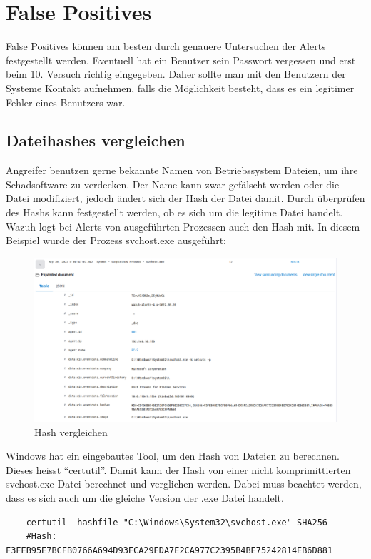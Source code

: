 \section{False Positives}
False Positives können am besten durch genauere Untersuchen der Alerts festgestellt werden.
Eventuell hat ein Benutzer sein Passwort vergessen und erst beim 10. Versuch richtig eingegeben.
Daher sollte man mit den Benutzern der Systeme Kontakt aufnehmen, falls die Möglichkeit besteht, dass es ein legitimer Fehler eines Benutzers war.  

\subsection{Dateihashes vergleichen}
Angreifer benutzen gerne bekannte Namen von Betriebssystem Dateien, um ihre Schadsoftware zu verdecken.
Der Name kann zwar gefälscht werden oder die Datei modifiziert, jedoch ändert sich der Hash der Datei damit.
Durch überprüfen des Hashs kann festgestellt werden, ob es sich um die legitime Datei handelt. \\

Wazuh logt bei Alerts von ausgeführten Prozessen auch den Hash mit.
In diesem Beispiel wurde der Prozess svchost.exe ausgeführt:
\begin{figure}[H]
    \centering
    \includegraphics[width=\linewidth]{../img/check-hash-1.png}
    \caption{Hash vergleichen}
\end{figure}

Windows hat ein eingebautes Tool, um den Hash von Dateien zu berechnen.
Dieses heisst ``certutil''.
Damit kann der Hash von einer nicht komprimittierten svchost.exe Datei berechnet und verglichen werden.
Dabei muss beachtet werden, dass es sich auch um die gleiche Version der .exe Datei handelt.

\begin{lstlisting}
    certutil -hashfile "C:\Windows\System32\svchost.exe" SHA256
    #Hash: F3FEB95E7BCFB0766A694D93FCA29EDA7E2CA977C2395B4BE75242814EB6D881
\end{lstlisting}

